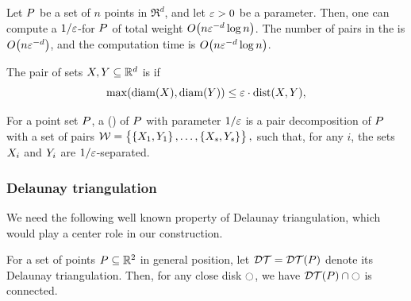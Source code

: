 \documentclass[12pt]{article}%
\begin{document}
\begin{theorem}
    Let $P$ be a set of $n$ points in $\Re^d$, and let $\varepsilon > 0$ be
    a parameter. Then, one can compute a $1/\varepsilon$-\SSPD for $P$ of
    total weight $O\pth{n \eps^{-d} \log n}$. The number of pairs in
    the \SSPD is $O\pth{n \eps^{-d}}$, and the computation time is
    $O\pth{ n \eps^{-d} \log n }$.
\end{theorem}

\begin{defn}
    The pair of sets $X, Y \subseteq \mathbb{R}^d$ is
    if
    \begin{equation*}
        \max \pth{ \diameterX{\PSB}, \diameterX{\PSC} } \leq
        \eps \cdot \DistSetY{\PSB}{\PSC},
    \end{equation*}
\end{defn}

\begin{defn}
    For a point set $P$, a  (\emphOnly{\WSPD{}}) of $P$ with parameter
    $1/\varepsilon$ is a pair decomposition of $P$ with a set of pairs
    \begin{math}
        \mathcal{W} = \left\{ {\bigl.
           \left\{ {X_1,Y_1} \right\},\ldots,\left\{ {X_s,Y_s} \right\}} \right\},
    \end{math}
    such that, for any $i$, the sets $X_i$ and $Y_i$ are
    $1/\varepsilon$-separated.
\end{defn}


\subsubsection{Delaunay triangulation}

We need the following well known property of Delaunay triangulation,
which would play a center role in our construction.

\begin{claim}
    For a set of points $P \subseteq \mathbb{R}^2$ in general position, let
    $\DT = \DTX{\PS}$ denote its Delaunay triangulation.  Then, for
    any close disk $\ocircle$, we have $\restrictY{\DTX{\PS}}{\disk}$ is
    connected.
\end{claim}

\newcommand{\cen}{\Mh{c}}%
\end{document}

